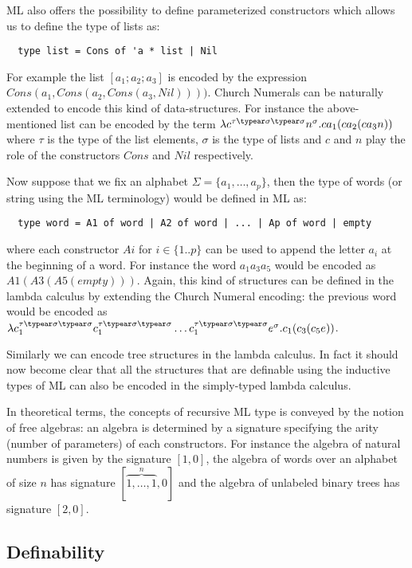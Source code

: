 ML also offers the possibility to define parameterized constructors
which allows us to define the type of lists as:
\begin{verbatim}
  type list = Cons of 'a * list | Nil
\end{verbatim}
For example the list $[a_1;a_2;a_3]$ is encoded by the expression
$Cons(a_1,Cons(a_2,Cons(a_3,Nil))))$. Church Numerals can be
naturally extended to encode this kind of data-structures. For
instance the above-mentioned list can be encoded by the term
$\lambda c^{\tau\typear\sigma\typear\sigma} n^\sigma . c a_1 ( c a_2
(c a_3 n))$ where $\tau$ is the type of the list elements, $\sigma$
is the type of lists and $c$ and $n$ play the role of the
constructors $Cons$ and $Nil$ respectively.

Now suppose that we fix an alphabet $\Sigma = \{ a_1, \ldots, a_p
\}$, then the type of words (or string using the ML terminology)
would be defined in ML as:
\begin{verbatim}
  type word = A1 of word | A2 of word | ... | Ap of word | empty
\end{verbatim}
where each constructor $Ai$ for $i \in\{1..p\}$ can be used to
append the letter $a_i$ at the beginning of a word. For instance the
word $a_1 a_3 a_5$ would be encoded as $A1(A3(A5(empty)))$. Again,
this kind of structures can be defined in the lambda calculus by
extending the Church Numeral encoding: the previous word would be
encoded as $\lambda c_1^{\tau\typear\sigma\typear\sigma}
c_1^{\tau\typear\sigma\typear\sigma} \ldots
c_1^{\tau\typear\sigma\typear\sigma} e^\sigma . c_1 ( c_3 (c_5 e))$.

Similarly we can encode tree structures in the lambda calculus. In
fact it should now become clear that all the structures that are
definable using the inductive types of ML can also be encoded in the
simply-typed lambda calculus.


In theoretical terms, the concepts of recursive ML type is conveyed
by the notion of free algebras: an algebra is determined by a
signature specifying the arity (\ie number of parameters) of each
constructors. For instance the algebra of natural numbers is given
by the signature $[1,0]$, the algebra of words over an alphabet of
size $n$ has signature $[\overbrace{1,\ldots,1}^{n},0]$ and the
algebra of unlabeled binary trees has signature $[2,0]$.


\subsection{Definability}

